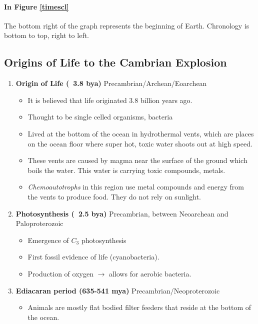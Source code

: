 \documentclass[12pt]{article}
\begin{document}
\paragraph{In Figure \ref{timescl}}
The bottom right of the graph represents the beginning of Earth. Chronology is bottom to top, right to left.

\subsection{Origins of Life to the Cambrian Explosion}
\begin{enumerate}
    \item \textbf{Origin of Life (~3.8 bya)} Precambrian/Archean/Eoarchean
          \begin{itemize}
              \item It is believed that life originated 3.8 billion years ago.
              \item Thought to be single celled organisms, bacteria
              \item Lived at the bottom of the ocean in hydrothermal vents, which are places on the ocean floor where super hot, toxic water shoots out at high speed.
              \item These vents are caused by magma near the surface of the ground which boils the water. This water is carrying toxic compounds, metals.
              \item \textit{Chemoautotrophs} in this region use metal compounds and energy from the vents to produce food. They do not rely on sunlight.
          \end{itemize}
    \item \textbf{Photosynthesis (~2.5 bya)} Precambrian, between Neoarchean and Paloproterozoic
          \begin{itemize}
              \item Emergence of $C_3$ photosynthesis
              \item First fossil evidence of life (cyanobacteria).
              \item Production of oxygen $\rightarrow$ allows for aerobic bacteria.
          \end{itemize}
    \item \textbf{Ediacaran period (635-541 mya)} Precambrian/Neoproterozoic
          \begin{itemize}
              \item Animals are mostly flat bodied filter feeders that reside at the bottom of the ocean.

\end{itemize}
\end{enumerate}
\end{document}
